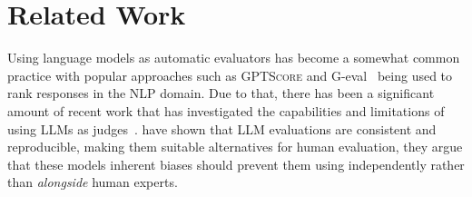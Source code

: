 \section{Related Work}







Using language models as automatic evaluators has become a somewhat common practice with popular approaches such as \textsc{GPTScore} and G-eval~\citep{fu2023gptscore,liu2023geval} being used to rank responses in the NLP domain. 
Due to that, there has been a significant amount of recent work that has investigated the capabilities and limitations of using LLMs as judges~\citep{thakur2024judging, chiang2023can, murugadoss2024evaluating, shankar2024validates}. 
\citet{chiang2023can} have shown that LLM evaluations are consistent and reproducible, making them suitable alternatives for human evaluation, they argue that these models inherent biases should prevent them using independently rather than \textit{alongside} human experts. 
